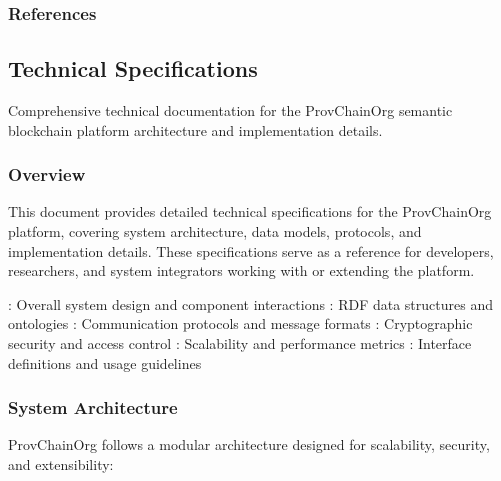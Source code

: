 \documentclass[letterpaper,10pt,english]{sphinxmanual}
\begin{document}
\subsubsection{References}
\label{\detokenize{research/rdf-canonicalization-algorithm:references}}


\sphinxstepscope


\subsection{Technical Specifications}
\label{\detokenize{research/technical-specifications:technical-specifications}}\label{\detokenize{research/technical-specifications::doc}}
\sphinxAtStartPar
Comprehensive technical documentation for the ProvChainOrg semantic blockchain platform architecture and implementation details.




\subsubsection{Overview}
\label{\detokenize{research/technical-specifications:overview}}
\sphinxAtStartPar
This document provides detailed technical specifications for the ProvChainOrg platform, covering system architecture, data models, protocols, and implementation details. These specifications serve as a reference for developers, researchers, and system integrators working with or extending the platform.

\sphinxAtStartPar
{}
\sphinxhyphen{} : Overall system design and component interactions
\sphinxhyphen{} : RDF data structures and ontologies
\sphinxhyphen{} : Communication protocols and message formats
\sphinxhyphen{} : Cryptographic security and access control
\sphinxhyphen{} : Scalability and performance metrics
\sphinxhyphen{} : Interface definitions and usage guidelines


\subsubsection{System Architecture}
\label{\detokenize{research/technical-specifications:system-architecture}}
\sphinxAtStartPar
ProvChainOrg follows a modular architecture designed for scalability, security, and extensibility:
\end{document}
